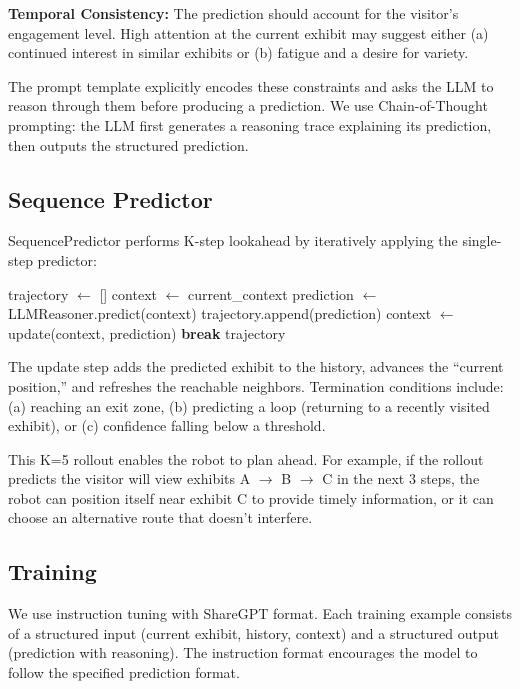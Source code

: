 \documentclass[letterpaper]{article}
\begin{document}
\textbf{Temporal Consistency:} The prediction should account for the visitor's engagement level. High attention at the current exhibit may suggest either (a) continued interest in similar exhibits or (b) fatigue and a desire for variety.

The prompt template explicitly encodes these constraints and asks the LLM to reason through them before producing a prediction. We use Chain-of-Thought prompting: the LLM first generates a reasoning trace explaining its prediction, then outputs the structured prediction.

\subsection{Sequence Predictor}

SequencePredictor performs K-step lookahead by iteratively applying the single-step predictor:

\begin{algorithm}[h]
\caption{K-Step Sequence Prediction}
\begin{algorithmic}[1]
\STATE trajectory $\leftarrow$ []
\STATE context $\leftarrow$ current\_context
    \STATE prediction $\leftarrow$ LLMReasoner.predict(context)
    \STATE trajectory.append(prediction)
    \STATE context $\leftarrow$ update(context, prediction)
     \textbf{break} \ENDIF
\ENDFOR
\RETURN trajectory
\end{algorithmic}
\end{algorithm}

The update step adds the predicted exhibit to the history, advances the ``current position,'' and refreshes the reachable neighbors. Termination conditions include: (a) reaching an exit zone, (b) predicting a loop (returning to a recently visited exhibit), or (c) confidence falling below a threshold.

This K=5 rollout enables the robot to plan ahead. For example, if the rollout predicts the visitor will view exhibits A $\rightarrow$ B $\rightarrow$ C in the next 3 steps, the robot can position itself near exhibit C to provide timely information, or it can choose an alternative route that doesn't interfere.

\subsection{Training}

We use instruction tuning with ShareGPT format. Each training example consists of a structured input (current exhibit, history, context) and a structured output (prediction with reasoning). The instruction format encourages the model to follow the specified prediction format.
\end{document}
